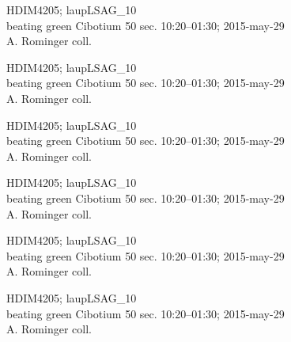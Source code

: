 \documentclass[2pt]{extarticle}
\begin{document}
\noindent
\parbox{0.16\textwidth}{\tiny \raggedright \rule[-0.3\baselineskip]{0pt}{10pt}HDIM4205; laupLSAG\_10\\ beating green Cibotium 50 sec. 10:20--01:30; 2015-may-29\\ A. Rominger coll.}
\parbox{0.16\textwidth}{\tiny \raggedright \rule[-0.3\baselineskip]{0pt}{10pt}HDIM4205; laupLSAG\_10\\ beating green Cibotium 50 sec. 10:20--01:30; 2015-may-29\\ A. Rominger coll.}
\parbox{0.16\textwidth}{\tiny \raggedright \rule[-0.3\baselineskip]{0pt}{10pt}HDIM4205; laupLSAG\_10\\ beating green Cibotium 50 sec. 10:20--01:30; 2015-may-29\\ A. Rominger coll.}
\parbox{0.16\textwidth}{\tiny \raggedright \rule[-0.3\baselineskip]{0pt}{10pt}HDIM4205; laupLSAG\_10\\ beating green Cibotium 50 sec. 10:20--01:30; 2015-may-29\\ A. Rominger coll.}
\parbox{0.16\textwidth}{\tiny \raggedright \rule[-0.3\baselineskip]{0pt}{10pt}HDIM4205; laupLSAG\_10\\ beating green Cibotium 50 sec. 10:20--01:30; 2015-may-29\\ A. Rominger coll.}
\parbox{0.16\textwidth}{\tiny \raggedright \rule[-0.3\baselineskip]{0pt}{10pt}HDIM4205; laupLSAG\_10\\ beating green Cibotium 50 sec. 10:20--01:30; 2015-may-29\\ A. Rominger coll.} \\ 
\vspace{0.001in} 
\end{document}
